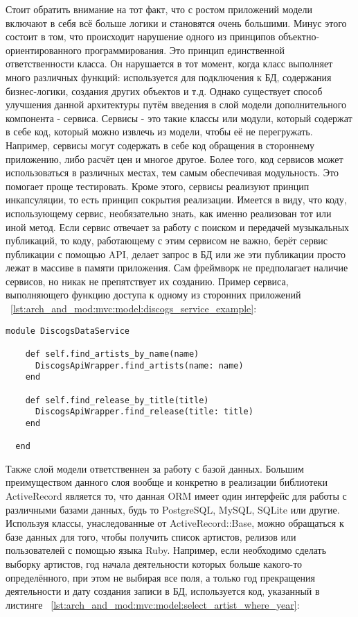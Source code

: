 Стоит обратить внимание на тот факт, что с ростом приложений модели включают в себя всё больше логики и становятся очень большими. Минус этого состоит в том, что происходит нарушение одного из принципов объектно-ориентированного программирования. Это принцип единственной ответственности класса. Он нарушается в тот момент, когда класс выполняет много различных функций: используется для подключения к БД, содержания бизнес-логики, создания других объектов и т.д. Однако существует способ улучшения данной архитектуры путём введения в слой модели дополнительного компонента - сервиса. Сервисы - это такие классы или модули, который содержат в себе код, который можно извлечь из модели, чтобы её не перегружать. Например, сервисы могут содержать в себе код обращения в стороннему приложению, либо расчёт цен и многое другое. Более того, код сервисов может использоваться в различных местах, тем самым обеспечивая модульность. Это помогает проще тестировать. Кроме этого, сервисы реализуют принцип инкапсуляции, то есть принцип сокрытия реализации. Имеется в виду, что коду, использующему сервис, необязательно знать, как именно реализован тот или иной метод. Если сервис отвечает за работу с поиском и передачей музыкальных публикаций, то коду, работающему с этим сервисом не важно, берёт сервис публикации с помощью API, делает запрос в БД или же эти публикации просто лежат в массиве в памяти приложения. Сам фреймворк не предполагает наличие сервисов, но никак не препятствует их созданию. Пример сервиса, выполняющего функцию доступа к одному из сторонних приложений ~\ref{lst:arch_and_mod:mvc:model:discogs_service_example}:

\begin{lstlisting}[style=fsharpstyle,caption={Пример получения артистов по определённым параметрам}, label=lst:arch_and_mod:mvc:model:discogs_service_example]
  module DiscogsDataService

    def self.find_artists_by_name(name)
      DiscogsApiWrapper.find_artists(name: name)
    end

    def self.find_release_by_title(title)
      DiscogsApiWrapper.find_release(title: title)
    end

  end
\end{lstlisting}

Также слой модели ответственнен за работу с базой данных. Большим преимуществом данного слоя вообще и конкретно в реализации библиотеки ActiveRecord является то, что данная ORM имеет один интерфейс для работы с различными базами данных, будь то PostgreSQL, MySQL, SQLite или другие. Используя классы, унаследованные от ActiveRecord::Base, можно обращаться к базе данных для того, чтобы получить список артистов, релизов или пользователей с помощью языка Ruby. Например, если необходимо сделать выборку артистов, год начала деятельности которых больше какого-то определённого, при этом не выбирая все поля, а только год прекращения деятельности и дату создания записи в БД, используется код, указанный в листинге ~\ref{lst:arch_and_mod:mvc:model:select_artist_where_year}:

